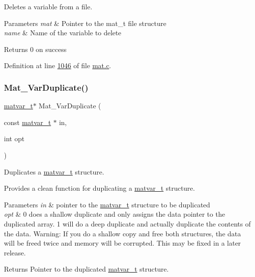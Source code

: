 Deletes a variable from a file. 


\begin{DoxyParams}{Parameters}
{\em mat} & Pointer to the mat\+\_\+t file structure \\
\hline
{\em name} & Name of the variable to delete \\
\hline
\end{DoxyParams}
\begin{DoxyReturn}{Returns}
0 on success 
\end{DoxyReturn}


Definition at line \hyperlink{mat_8c_source_l01046}{1046} of file \hyperlink{mat_8c_source}{mat.\+c}.

\mbox{\label{group___m_a_t_ga7ef80c5d99d7918b2b09db3bea106ecc}} 
\subsubsection{\texorpdfstring{Mat\+\_\+\+Var\+Duplicate()}{Mat\_VarDuplicate()}}
{\footnotesize\ttfamily \hyperlink{group___m_a_t_structmatvar__t}{matvar\+\_\+t}$\ast$ Mat\+\_\+\+Var\+Duplicate (\begin{DoxyParamCaption}\item[{const \hyperlink{group___m_a_t_structmatvar__t}{matvar\+\_\+t} $\ast$}]{in,  }\item[{int}]{opt }\end{DoxyParamCaption})}



Duplicates a \hyperlink{group___m_a_t_structmatvar__t}{matvar\+\_\+t} structure. 

Provides a clean function for duplicating a \hyperlink{group___m_a_t_structmatvar__t}{matvar\+\_\+t} structure.


\begin{DoxyParams}{Parameters}
{\em in} & pointer to the \hyperlink{group___m_a_t_structmatvar__t}{matvar\+\_\+t} structure to be duplicated \\
\hline
{\em opt} & 0 does a shallow duplicate and only assigns the data pointer to the duplicated array. 1 will do a deep duplicate and actually duplicate the contents of the data. Warning\+: If you do a shallow copy and free both structures, the data will be freed twice and memory will be corrupted. This may be fixed in a later release. \\
\hline
\end{DoxyParams}
\begin{DoxyReturn}{Returns}
Pointer to the duplicated \hyperlink{group___m_a_t_structmatvar__t}{matvar\+\_\+t} structure. 
\end{DoxyReturn}


